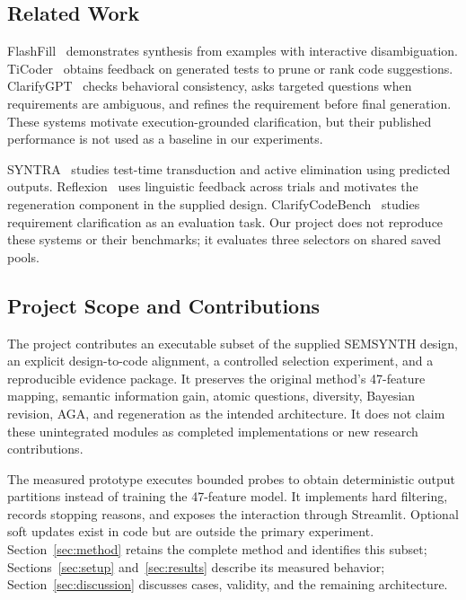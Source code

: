 \subsection{Related Work}
FlashFill~\cite{flashfill} demonstrates synthesis from examples with interactive disambiguation. TiCoder~\cite{ticoder} obtains feedback on generated tests to prune or rank code suggestions. ClarifyGPT~\cite{clarifygpt} checks behavioral consistency, asks targeted questions when requirements are ambiguous, and refines the requirement before final generation. These systems motivate execution-grounded clarification, but their published performance is not used as a baseline in our experiments.

SYNTRA~\cite{syntra} studies test-time transduction and active elimination using predicted outputs. Reflexion~\cite{reflexion} uses linguistic feedback across trials and motivates the regeneration component in the supplied design. ClarifyCodeBench~\cite{clarifycodebench} studies requirement clarification as an evaluation task. Our project does not reproduce these systems or their benchmarks; it evaluates three selectors on shared saved pools.

\subsection{Project Scope and Contributions}
The project contributes an executable subset of the supplied SEMSYNTH design, an explicit design-to-code alignment, a controlled selection experiment, and a reproducible evidence package. It preserves the original method's 47-feature mapping, semantic information gain, atomic questions, diversity, Bayesian revision, AGA, and regeneration as the intended architecture. It does not claim these unintegrated modules as completed implementations or new research contributions.

The measured prototype executes bounded probes to obtain deterministic output partitions instead of training the 47-feature model. It implements hard filtering, records stopping reasons, and exposes the interaction through Streamlit. Optional soft updates exist in code but are outside the primary experiment. Section~\ref{sec:method} retains the complete method and identifies this subset; Sections~\ref{sec:setup} and~\ref{sec:results} describe its measured behavior; Section~\ref{sec:discussion} discusses cases, validity, and the remaining architecture.
